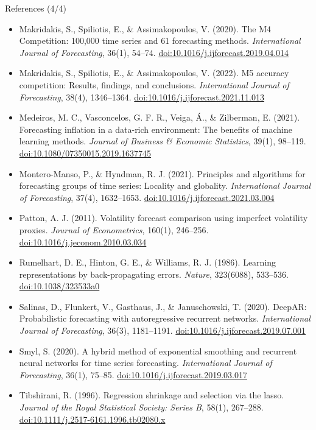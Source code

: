 \begin{frame}{References (4/4)}
\itemsize{\scriptsize}
\begin{itemize}
    \item Makridakis, S., Spiliotis, E., \& Assimakopoulos, V. (2020). The M4 Competition: 100,000 time series and 61 forecasting methods. \textit{International Journal of Forecasting}, 36(1), 54--74. \href{https://doi.org/10.1016/j.ijforecast.2019.04.014}{doi:10.1016/j.ijforecast.2019.04.014}
    \item Makridakis, S., Spiliotis, E., \& Assimakopoulos, V. (2022). M5 accuracy competition: Results, findings, and conclusions. \textit{International Journal of Forecasting}, 38(4), 1346--1364. \href{https://doi.org/10.1016/j.ijforecast.2021.11.013}{doi:10.1016/j.ijforecast.2021.11.013}
    \item Medeiros, M. C., Vasconcelos, G. F. R., Veiga, \'A., \& Zilberman, E. (2021). Forecasting inflation in a data-rich environment: The benefits of machine learning methods. \textit{Journal of Business \& Economic Statistics}, 39(1), 98--119. \href{https://doi.org/10.1080/07350015.2019.1637745}{doi:10.1080/07350015.2019.1637745}
    \item Montero-Manso, P., \& Hyndman, R. J. (2021). Principles and algorithms for forecasting groups of time series: Locality and globality. \textit{International Journal of Forecasting}, 37(4), 1632--1653. \href{https://doi.org/10.1016/j.ijforecast.2021.03.004}{doi:10.1016/j.ijforecast.2021.03.004}
    \item Patton, A. J. (2011). Volatility forecast comparison using imperfect volatility proxies. \textit{Journal of Econometrics}, 160(1), 246--256. \href{https://doi.org/10.1016/j.jeconom.2010.03.034}{doi:10.1016/j.jeconom.2010.03.034}
    \item Rumelhart, D. E., Hinton, G. E., \& Williams, R. J. (1986). Learning representations by back-propagating errors. \textit{Nature}, 323(6088), 533--536. \href{https://doi.org/10.1038/323533a0}{doi:10.1038/323533a0}
    \item Salinas, D., Flunkert, V., Gasthaus, J., \& Januschowski, T. (2020). DeepAR: Probabilistic forecasting with autoregressive recurrent networks. \textit{International Journal of Forecasting}, 36(3), 1181--1191. \href{https://doi.org/10.1016/j.ijforecast.2019.07.001}{doi:10.1016/j.ijforecast.2019.07.001}
    \item Smyl, S. (2020). A hybrid method of exponential smoothing and recurrent neural networks for time series forecasting. \textit{International Journal of Forecasting}, 36(1), 75--85. \href{https://doi.org/10.1016/j.ijforecast.2019.03.017}{doi:10.1016/j.ijforecast.2019.03.017}
    \item Tibshirani, R. (1996). Regression shrinkage and selection via the lasso. \textit{Journal of the Royal Statistical Society: Series B}, 58(1), 267--288. \href{https://doi.org/10.1111/j.2517-6161.1996.tb02080.x}{doi:10.1111/j.2517-6161.1996.tb02080.x}
\end{itemize}
\end{frame}


